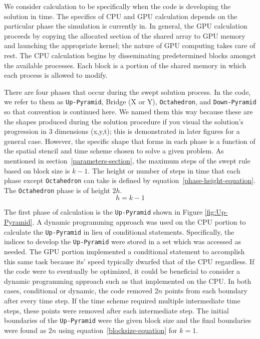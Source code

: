 \documentclass[review]{elsarticle}
\def\Up{\texttt{Up-Pyramid}}
\def\Down{\texttt{Down-Pyramid}}
\def\Oct{\texttt{Octahedron}}
\begin{document}
 \par
 We consider calculation to be specifically when the code is developing the solution in time. The specifics of CPU and GPU calculation depends on the particular phase the simulation is currently in. In general, the GPU calculation proceeds by copying the allocated section of the shared array to GPU memory and launching the appropriate kernel; the nature of GPU computing takes care of rest. The CPU calculation begins by disseminating predetermined blocks amongst the available processes. Each block is a portion of the shared memory in which each process is allowed to modify.
 
\par
There are four phases that occur during the swept solution process. In the code, we refer to them as \Up{}, Bridge (X or Y), \Oct{}, and \Down{} so that convention is continued here. We named them this way because these are the shapes produced during the solution procedure if you visual the solution's progression in 3 dimensions (x,y,t); this is demonstrated in later figures for a general case. However, the specific shape that forms in each phase is a function of the spatial stencil and time scheme chosen to solve a given problem. As mentioned in section~\ref{parameters-section}, the maximum steps of the swept rule based on block size is $k-1$. The height or number of steps in time that each phase except \Oct{} can take is defined by equation~\ref{phase-height-equation}. The \Oct{} phase is of height $2h$.
\begin{equation}
    \label{phase-height-equation}
    h=k-1
\end{equation}
 
\par
The first phase of calculation is the \Up{} shown in Figure \ref{fig:Up-Pyramid}. A dynamic programming approach was used on the CPU portion to calculate the \Up{} in lieu of conditional statements. Specifically, the indices to develop the \Up{} were stored in a set which was accessed as needed. The GPU portion implemented a conditional statement to accomplish this same task because its' speed typically dwarfed that of the CPU regardless. If the code were to eventually be optimized, it could be beneficial to consider a dynamic programming approach such as that implemented on the CPU. In both cases, conditional or dynamic, the code removed $2n$ points from each boundary after every time step. If the time scheme required multiple intermediate time steps, these points were removed after each intermediate step. The initial boundaries of the \Up{} were the given block size and the final boundaries were found as $2n$ using equation~\ref{blocksize-equation} for $k=1$.
\end{document}
